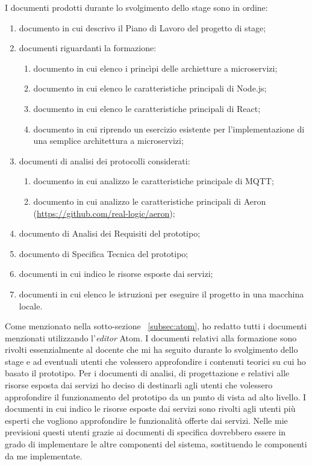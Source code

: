 I documenti prodotti durante lo svolgimento dello stage sono in ordine:
\begin{enumerate}
	\item documento in cui descrivo il Piano di Lavoro del progetto di stage;
	\item documenti riguardanti la formazione:
		\begin{enumerate}
			\item documento in cui elenco i princìpi delle archietture a microservizi;
			\item documento in cui elenco le caratteristiche principali di Node.js;
			\item documento in cui elenco le caratteristiche principali di React;
			\item documento in cui riprendo un esercizio esistente per l'implementazione di una semplice architettura a microservizi;
		\end{enumerate}
		\item documenti di analisi dei protocolli considerati:
		\begin{enumerate}
			\item documento in cui analizzo le caratteristiche principale di MQTT;
			\item documento in cui analizzo le caratteristiche principali di Aeron (\url{https://github.com/real-logic/aeron});
		\end{enumerate}
		\item documento di Analisi dei Requisiti del prototipo;
		\item documento di Specifica Tecnica del prototipo;
		\item documenti in cui indico le risorse esposte dai servizi;
		\item documenti in cui elenco le istruzioni per eseguire il progetto in una macchina locale.
\end{enumerate}
Come menzionato nella sotto-sezione ~\ref{subsec:atom}, ho redatto tutti i documenti menzionati utilizzando l'\emph{editor} Atom.
I documenti relativi alla formazione sono rivolti essenzialmente al docente che mi ha seguito durante lo svolgimento dello stage e ad eventuali utenti che volessero approfondire i contenuti teorici su cui ho basato il prototipo.
Per i documenti di analisi, di progettazione e relativi alle risorse esposta dai servizi ho deciso di destinarli agli utenti che volessero approfondire il funzionamento del prototipo da un punto di vista ad alto livello.
I documenti in cui indico le risorse esposte dai servizi sono rivolti agli utenti più esperti che vogliono approfondire le funzionalità offerte dai servizi. Nelle mie previsioni questi utenti grazie ai documenti di specifica dovrebbero essere in grado di implementare le altre componenti del sistema, sostituendo le componenti da me implementate.
